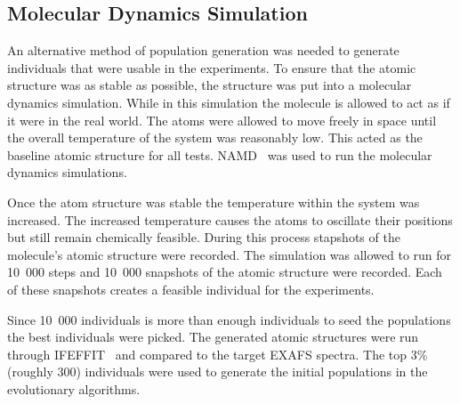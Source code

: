 
\subsection{Molecular Dynamics Simulation}
\label{subsec:molecular-population}

An alternative method of population generation was needed to generate individuals that were usable in the experiments. To ensure that the atomic structure was as stable as possible, the structure was put into a molecular dynamics simulation. While in this simulation the molecule is allowed to act as if it were in the real world. The atoms were allowed to move freely in space until the overall temperature of the system was reasonably low. This acted as the baseline atomic structure for all tests. NAMD~\cite{namd} was used to run the molecular dynamics simulations.

Once the atom structure was stable the temperature within the system was increased. The increased temperature causes the atoms to oscillate their positions but still remain chemically feasible. During this process stapshots of the molecule's atomic structure were recorded. The simulation was allowed to run for 10\ 000 steps and 10\ 000 snapshots of the atomic structure were recorded. Each of these snapshots creates a feasible individual for the experiments.

Since 10\ 000 individuals is more than enough individuals to seed the populations the best individuals were picked. The generated atomic structures were run through IFEFFIT~\cite{ifeffit} and compared to the target EXAFS spectra. The top 3\% (roughly 300) individuals were used to generate the initial populations in the evolutionary algorithms.